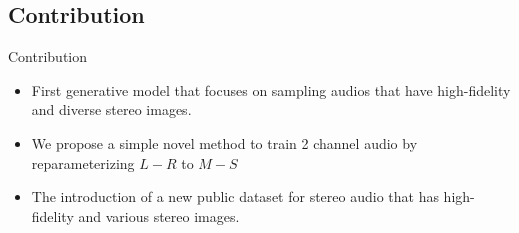 \subsection{Contribution}
\begin{frame}{Contribution}
    \begin{itemize}
        \item First generative model that focuses on sampling audios that have high-fidelity and diverse stereo images. 
        \bigskip
        \item We propose a simple novel method to train 2 channel audio by reparameterizing $L-R$ to $M-S$
        \bigskip
        \item The introduction of a new public dataset for stereo audio that has high-fidelity and various stereo images.
    \end{itemize}
\end{frame}